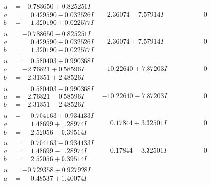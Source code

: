 \documentclass[1p]{elsarticle_modified}
\theoremstyle{definition}
\begin{document}
$$\begin{array}{c|c|c}
 \hline 
\begin{aligned}
u &= -0.788650 + 0.825251 I \\
a &= \phantom{-}0.429590 - 0.032526 I \\
b &= \phantom{-}1.320190 + 0.022577 I\end{aligned}
 & -2.36074 - 7.57914 I & \phantom{-0.000000 } 0 \\ \hline\begin{aligned}
u &= -0.788650 - 0.825251 I \\
a &= \phantom{-}0.429590 + 0.032526 I \\
b &= \phantom{-}1.320190 - 0.022577 I\end{aligned}
 & -2.36074 + 7.57914 I & \phantom{-0.000000 } 0 \\ \hline\begin{aligned}
u &= \phantom{-}0.580403 + 0.990368 I \\
a &= -2.76821 + 0.58596 I \\
b &= -2.31851 + 2.48526 I\end{aligned}
 & -10.22640 + 7.87203 I & \phantom{-0.000000 } 0 \\ \hline\begin{aligned}
u &= \phantom{-}0.580403 - 0.990368 I \\
a &= -2.76821 - 0.58596 I \\
b &= -2.31851 - 2.48526 I\end{aligned}
 & -10.22640 - 7.87203 I & \phantom{-0.000000 } 0 \\ \hline\begin{aligned}
u &= \phantom{-}0.704163 + 0.934133 I \\
a &= \phantom{-}1.48699 + 1.28974 I \\
b &= \phantom{-}2.52056 - 0.39514 I\end{aligned}
 & \phantom{-}0.17844 + 3.32501 I & \phantom{-0.000000 } 0 \\ \hline\begin{aligned}
u &= \phantom{-}0.704163 - 0.934133 I \\
a &= \phantom{-}1.48699 - 1.28974 I \\
b &= \phantom{-}2.52056 + 0.39514 I\end{aligned}
 & \phantom{-}0.17844 - 3.32501 I & \phantom{-0.000000 } 0 \\ \hline\begin{aligned}
u &= -0.729358 + 0.927928 I \\
a &= \phantom{-}0.48537 + 1.40074 I \\

\end{aligned}
\end{array}$$
\end{document}
